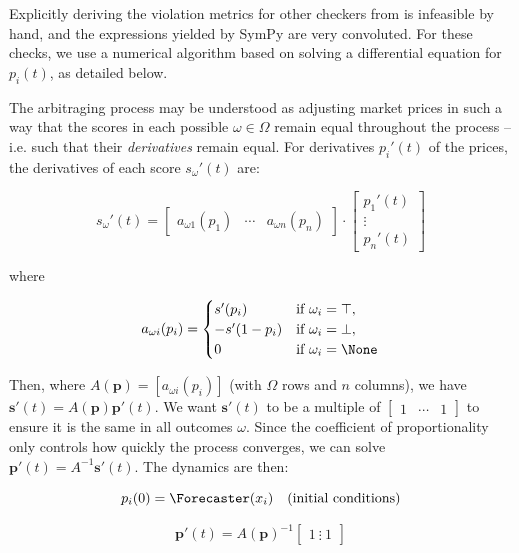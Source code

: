Explicitly deriving the violation metrics for other checkers from  is infeasible by hand, and the expressions yielded by SymPy are very convoluted. For these checks, we use a numerical algorithm based on solving a differential equation for $p_i(t)$, as detailed below.

The arbitraging process may be understood as adjusting market prices in such a way that the scores in each possible $\omega\in\Omega$ remain equal throughout the process -- i.e. such that their \emph{derivatives} remain equal. For derivatives $p_i'(t)$ of the prices, the derivatives of each score $s_\omega'(t)$ are:

\begin{equation*}
    s_\omega'(t)=
\begin{bmatrix}
    a_{\omega 1}(p_1) & \cdots & a_{\omega n}(p_n)
\end{bmatrix}
    \cdot
\begin{bmatrix}
    p_1'(t) \\
    \vdots \\
    p_n'(t)
\end{bmatrix}
\end{equation*}

where

\begin{equation*}
a_{\omega i}(p_i) =
\begin{cases}
    s'(p_i) & \text{if } \omega_i = \top, \\
    -s'(1 - p_i) & \text{if } \omega_i = \bot, \\
    0 & \text{if } \omega_i = \None
\end{cases}
\end{equation*}

Then, where $A(\mathbf{p})=[a_{\omega i}(p_i)]$ (with $\Omega$ rows and $n$ columns), we have $\mathbf{s}'(t)=A(\mathbf{p})\mathbf{p}'(t)$. We want $\mathbf{s}'(t)$ to be a multiple of $\begin{bmatrix}1 & \cdots & 1\end{bmatrix}$ to ensure it is the same in all outcomes $\omega$. Since the coefficient of proportionality only controls how quickly the process converges, we can solve $\mathbf{p}'(t)=A^{-1}\mathbf{s}'(t)$.
The dynamics are then:

\begin{equation*}
p_i(0) = \Forecaster(x_i)\quad\text{(initial conditions)}
\end{equation*}

\begin{equation*}
\mathbf{p}'(t) = A(\mathbf{p})^{-1}\begin{bmatrix}
1 \ \vdots \ 1
\end{bmatrix}
\end{equation*}

